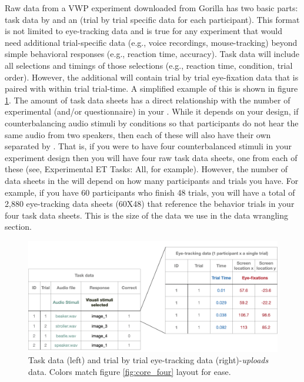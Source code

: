 Raw data from a VWP experiment downloaded from Gorilla has two basic parts: task data by  and an  (trial by trial specific data for each participant). This format is not limited to eye-tracking data and is true for any experiment that would need additional trial-specific data (e.g., voice recordings, mouse-tracking) beyond simple behavioral responses (e.g., reaction time, accuracy). Task data will include all selections and timings of those selections (e.g., reaction time, condition, trial order). However, the additional  will contain trial by trial eye-fixation data that is paired with within trial trial-time. A simplified example of this is shown in figure \ref{fig:data_structure}. The amount of task data sheets has a direct relationship with the number of experimental (and/or questionnaire)  in your . While it depends on your design, if counterbalancing audio stimuli by conditions so that participants do not hear the same audio from two speakers, then each of these will also have their own  separated by . That is, if you were to have four counterbalanced stimuli  in your experiment design then you will have four raw task data sheets, one from each of these  (see, Experimental ET Tasks: All, for example). However, the number of data sheets in the  will depend on how many participants and trials you have. For example, if you have 60 participants who finish 48 trials, you will have a total of 2,880 eye-tracking data sheets (60X48) that reference the behavior trials in your four task data sheets. This is the size of the data we use in the data wrangling section.

\begin{figure}[ht]
    \centering
    \includegraphics[scale=.3]{figures/data_structure.png}
    \caption{Task data (left) and trial by trial eye-tracking data (right)-\textit{uploads} data. Colors match figure \ref{fig:core_four} layout for ease.}
    \label{fig:data_structure}
\end{figure}

